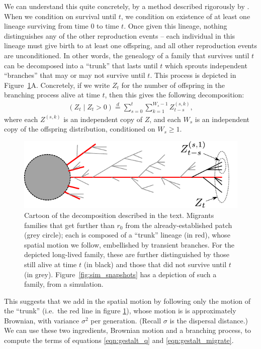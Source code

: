 \documentclass{article}
\renewcommand{\P}{\mathbb{P}}
\newcommand{\deq}{\stackrel{\scriptscriptstyle{d}}{=}}
\begin{document}
We can understand this quite concretely, by a method described rigorously by \citet{geiger1999elementary}.
When we condition on survival until $t$, we condition on existence of at least one lineage surviving from time $0$ to time $t$.
Once given this lineage, nothing distinguishes any of the other reproduction events --
each individual in this lineage must give birth to at least one offspring,
and all other reproduction events are unconditioned.
In other words, the genealogy of a family that survives until $t$
can be decomposed into a ``trunk'' that lasts until $t$
which sprouts independent ``branches'' that may or may not survive until $t$.
This process is depicted in Figure~\ref{fig:branching_decomp}A.
Concretely, if we write $Z_t$ for the number of offspring in the branching process alive at time $t$,
then this gives the following decomposition:
\begin{align}
  \left( Z_t \; \vert \; Z_t>0 \right) \deq \sum_{s=0}^t \sum_{k=1}^{W_s-1} Z^{(s,k)}_{t-s},
\end{align}
where each $Z^{(s,k)}$ is an independent copy of $Z$,
and each $W_s$ is an independent copy of the offspring distribution, conditioned on $W_s \ge 1$.

\begin{figure}[ht!!]
  \begin{center}
    \includegraphics{branching-concept}
  \end{center}
\caption{Cartoon of the decomposition described in the text.
Migrants families that get further than $r_0$ from the already-established patch (grey circle);
each is composed of a ``trunk'' lineage (in red), whose spatial motion we follow,
embellished by transient branches.
For the depicted long-lived family, these are further distinguished by those still alive at time $t$ (in black)
and those that did not survive until $t$ (in grey).
Figure~\ref{fig:sim_snapshots} has a depiction of such a family, from a simulation.
\label{fig:branching_decomp}
}
\end{figure}

This suggests that we add in the spatial motion by following only the motion of the ``trunk''
(i.e.\ the red line in figure \ref{fig:branching_decomp}),
whose motion is is approximately Brownian, with variance $\sigma^2$ per generation.
(Recall $\sigma$ is the dispersal distance.)
We can use these two ingredients, Brownian motion and a branching process, 
to compute the terms of equations \eqref{eqn:gestalt_q} and \eqref{eqn:gestalt_migrate}.
\end{document}
